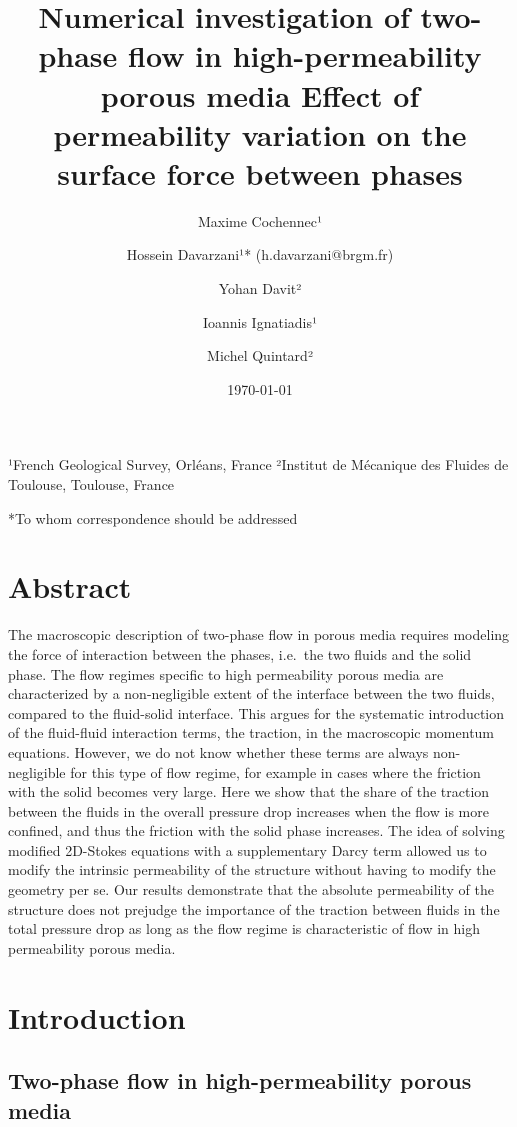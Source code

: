 \documentclass[]{article}
\title{Numerical investigation of two-phase flow in high-permeability porous
media Effect of permeability variation on the surface force between
phases}
\author{Maxime Cochennec¹ \and Hossein Davarzani¹* (h.davarzani@brgm.fr) \and Yohan Davit² \and Ioannis Ignatiadis¹ \and Michel Quintard²}
\date{\today{}}
\begin{document}
\maketitle

¹French Geological Survey, Orléans, France ²Institut de Mécanique des
Fluides de Toulouse, Toulouse, France

*To whom correspondence should be addressed


\hypertarget{abstract}{%
\section{Abstract}\label{abstract}}

The macroscopic description of two-phase flow in porous media requires
modeling the force of interaction between the phases, i.e.~the two
fluids and the solid phase. The flow regimes specific to high
permeability porous media are characterized by a non-negligible extent
of the interface between the two fluids, compared to the fluid-solid
interface. This argues for the systematic introduction of the
fluid-fluid interaction terms, the traction, in the macroscopic momentum
equations. However, we do not know whether these terms are always
non-negligible for this type of flow regime, for example in cases where
the friction with the solid becomes very large. Here we show that the
share of the traction between the fluids in the overall pressure drop
increases when the flow is more confined, and thus the friction with the
solid phase increases. The idea of solving modified 2D-Stokes equations
with a supplementary Darcy term allowed us to modify the intrinsic
permeability of the structure without having to modify the geometry per
se. Our results demonstrate that the absolute permeability of the
structure does not prejudge the importance of the traction between
fluids in the total pressure drop as long as the flow regime is
characteristic of flow in high permeability porous media.

\hypertarget{introduction}{%
\section{Introduction}\label{introduction}}

\hypertarget{two-phase-flow-in-high-permeability-porous-media}{%
\subsection{Two-phase flow in high-permeability porous
media}\label{two-phase-flow-in-high-permeability-porous-media}}
\end{document}
